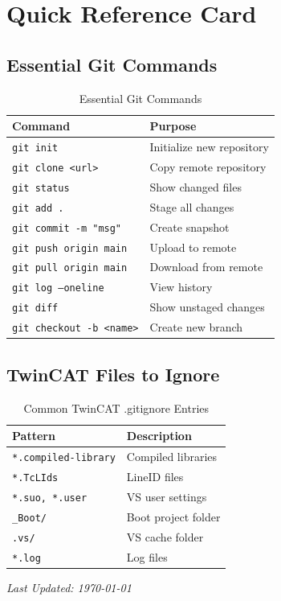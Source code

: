 \documentclass[11pt,a4paper]{article}
\begin{document}
\section*{Quick Reference Card}

\subsection*{Essential Git Commands}

\begin{table}[h]
\centering
\begin{tabular}{@{}ll@{}}
\toprule
\textbf{Command} & \textbf{Purpose} \\
\midrule
\texttt{git init} & Initialize new repository \\
\texttt{git clone <url>} & Copy remote repository \\
\texttt{git status} & Show changed files \\
\texttt{git add .} & Stage all changes \\
\texttt{git commit -m "msg"} & Create snapshot \\
\texttt{git push origin main} & Upload to remote \\
\texttt{git pull origin main} & Download from remote \\
\texttt{git log --oneline} & View history \\
\texttt{git diff} & Show unstaged changes \\
\texttt{git checkout -b <name>} & Create new branch \\
\bottomrule
\end{tabular}
\caption{Essential Git Commands}
\end{table}

\subsection*{TwinCAT Files to Ignore}

\begin{table}[h]
\centering
\begin{tabular}{@{}ll@{}}
\toprule
\textbf{Pattern} & \textbf{Description} \\
\midrule
\texttt{*.compiled-library} & Compiled libraries \\
\texttt{*.TcLIds} & LineID files \\
\texttt{*.suo, *.user} & VS user settings \\
\texttt{\_Boot/} & Boot project folder \\
\texttt{.vs/} & VS cache folder \\
\texttt{*.log} & Log files \\
\bottomrule
\end{tabular}
\caption{Common TwinCAT .gitignore Entries}
\end{table}

\vfill

\begin{center}
\textit{Last Updated: \today}
\end{center}
\end{document}
